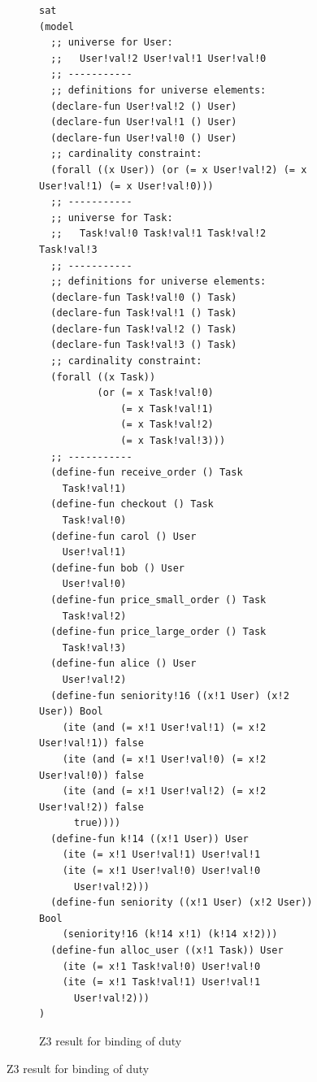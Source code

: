 \documentclass[a4paper]{report}
\begin{document}
\begin{figure}[!h]
\ContinuedFloat
\begin{subfigure}{\textwidth}
\lstset{numbers=none, showspaces=false,
    showstringspaces=false, tabsize=2, breaklines=true,
    xleftmargin=5.0ex, basicstyle=\tiny,
}
\begin{lstlisting}[frame=single]
sat
(model 
  ;; universe for User:
  ;;   User!val!2 User!val!1 User!val!0 
  ;; -----------
  ;; definitions for universe elements:
  (declare-fun User!val!2 () User)
  (declare-fun User!val!1 () User)
  (declare-fun User!val!0 () User)
  ;; cardinality constraint:
  (forall ((x User)) (or (= x User!val!2) (= x User!val!1) (= x User!val!0)))
  ;; -----------
  ;; universe for Task:
  ;;   Task!val!0 Task!val!1 Task!val!2 Task!val!3 
  ;; -----------
  ;; definitions for universe elements:
  (declare-fun Task!val!0 () Task)
  (declare-fun Task!val!1 () Task)
  (declare-fun Task!val!2 () Task)
  (declare-fun Task!val!3 () Task)
  ;; cardinality constraint:
  (forall ((x Task))
          (or (= x Task!val!0)
              (= x Task!val!1)
              (= x Task!val!2)
              (= x Task!val!3)))
  ;; -----------
  (define-fun receive_order () Task
    Task!val!1)
  (define-fun checkout () Task
    Task!val!0)
  (define-fun carol () User
    User!val!1)
  (define-fun bob () User
    User!val!0)
  (define-fun price_small_order () Task
    Task!val!2)
  (define-fun price_large_order () Task
    Task!val!3)
  (define-fun alice () User
    User!val!2)
  (define-fun seniority!16 ((x!1 User) (x!2 User)) Bool
    (ite (and (= x!1 User!val!1) (= x!2 User!val!1)) false
    (ite (and (= x!1 User!val!0) (= x!2 User!val!0)) false
    (ite (and (= x!1 User!val!2) (= x!2 User!val!2)) false
      true))))
  (define-fun k!14 ((x!1 User)) User
    (ite (= x!1 User!val!1) User!val!1
    (ite (= x!1 User!val!0) User!val!0
      User!val!2)))
  (define-fun seniority ((x!1 User) (x!2 User)) Bool
    (seniority!16 (k!14 x!1) (k!14 x!2)))
  (define-fun alloc_user ((x!1 Task)) User
    (ite (= x!1 Task!val!0) User!val!0
    (ite (= x!1 Task!val!1) User!val!1
      User!val!2)))
)
\end{lstlisting}
\caption{Z3 result for binding of duty}
\label{fig:Z3 result for binding of duty}
\end{subfigure}
\end{figure}
\end{document}

